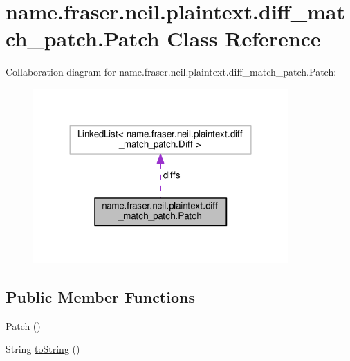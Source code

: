 \hypertarget{classname_1_1fraser_1_1neil_1_1plaintext_1_1diff__match__patch_1_1Patch}{}\section{name.\+fraser.\+neil.\+plaintext.\+diff\+\_\+match\+\_\+patch.\+Patch Class Reference}
\label{classname_1_1fraser_1_1neil_1_1plaintext_1_1diff__match__patch_1_1Patch}


Collaboration diagram for name.\+fraser.\+neil.\+plaintext.\+diff\+\_\+match\+\_\+patch.\+Patch\+:
\nopagebreak
\begin{figure}[H]
\begin{center}
\leavevmode
\includegraphics[width=276pt]{classname_1_1fraser_1_1neil_1_1plaintext_1_1diff__match__patch_1_1Patch__coll__graph}
\end{center}
\end{figure}
\subsection*{Public Member Functions}
\begin{DoxyCompactItemize}
\item 
\hyperlink{classname_1_1fraser_1_1neil_1_1plaintext_1_1diff__match__patch_1_1Patch_a4ae1f214668d66217e2a7ac0cedcf349}{Patch} ()
\item 
String \hyperlink{classname_1_1fraser_1_1neil_1_1plaintext_1_1diff__match__patch_1_1Patch_aa49a2e65f4a704ea5dda396a7db0998c}{to\+String} ()
\end{DoxyCompactItemize}
